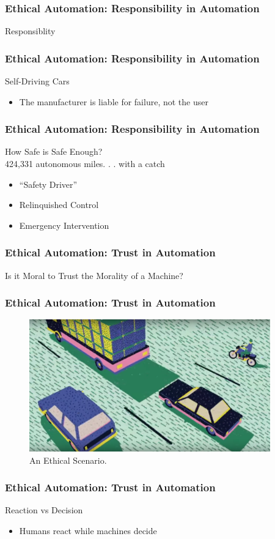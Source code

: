 \begin{frame}
	\frametitle{ Ethical Automation: Responsibility in Automation}
	\Large{Responsiblity}
\end{frame}


\begin{frame}
	\frametitle{ Ethical Automation: Responsibility in Automation}
	{\Large Self-Driving Cars}
	\begin{itemize}
		\item The manufacturer is liable for failure, not the user
	\end{itemize}
\end{frame}


\begin{frame}
	\frametitle{ Ethical Automation: Responsibility in Automation}
	{\Large How Safe is Safe Enough?}\\
	424,331 autonomous miles. . . with a catch
	\begin{itemize}
		\item ``Safety Driver''
		\item Relinquished Control
		\item Emergency Intervention
	\end{itemize}
\end{frame}


\begin{frame}
	\frametitle{ Ethical Automation: Trust in Automation}
	\Large{Is it Moral to Trust the Morality of a Machine?}
\end{frame}


\begin{frame}
	\frametitle{ Ethical Automation: Trust in Automation}
	\begin{figure}[bht]
		\centering
		\includegraphics[width=4.1in]{diagrams/image00}
		\caption{An Ethical Scenario.}
		\label{fig:-deg}
	\end{figure}
\end{frame}


\begin{frame}
	\frametitle{ Ethical Automation: Trust in Automation}
	{\Large Reaction vs Decision}
	\begin{itemize}
		\item Humans react while machines decide
	\end{itemize}
\end{frame}


